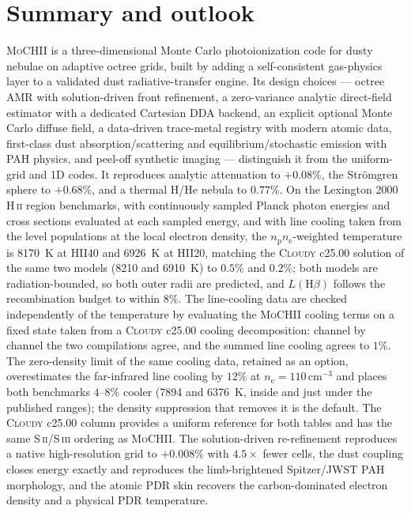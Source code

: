 \documentclass[twocolumn,linenumbers]{aastex702}
\newcommand{\MoCHII}{\textsc{MoCHII}}
\newcommand{\HII}{H\,\textsc{ii}}
\newcommand{\nelec}{n_{\mathrm{e}}}
\begin{document}
\section{Summary and outlook}
\label{sec:summary}

\MoCHII{} is a three-dimensional Monte Carlo photoionization code for dusty
nebulae on adaptive octree grids, built by adding a self-consistent
gas-physics layer to a validated dust radiative-transfer engine.  Its
design choices --- octree AMR with solution-driven front refinement, a
zero-variance analytic direct-field estimator with a dedicated Cartesian
DDA backend, an explicit optional Monte Carlo diffuse field, a
data-driven trace-metal registry with modern atomic data, first-class dust
absorption/scattering and equilibrium/stochastic emission with PAH physics,
and peel-off synthetic imaging --- distinguish it from the uniform-grid and
1D codes.  It reproduces analytic attenuation to $+0.08\%$, the Str\"omgren
sphere to $+0.68\%$, and a thermal H/He nebula to $0.77\%$.  On the
Lexington 2000 \HII{} region benchmarks, with continuously sampled Planck
photon energies and cross sections evaluated at each sampled energy, and
with line cooling taken from the level populations at the local electron
density, the
$n_{\mathrm{p}}n_{\mathrm{e}}$-weighted temperature is 8170~K at HII40 and
6926~K at HII20, matching the \textsc{Cloudy} c25.00 solution of the same
two models (8210 and 6910~K) to $0.5\%$ and $0.2\%$; both models are
radiation-bounded, so both outer radii are predicted, and
$L(\mathrm{H}\beta)$ follows the recombination budget to within $8\%$.  The
line-cooling data are checked independently of the temperature by evaluating
the \MoCHII{} cooling terms on a fixed state taken from a \textsc{Cloudy}
c25.00 cooling decomposition: channel by channel the two compilations agree,
and the summed line cooling agrees to $1\%$.  The zero-density limit of the
same cooling data, retained as an option, overestimates the far-infrared
line cooling by $12\%$ at $\nelec = 110\,\mathrm{cm^{-3}}$ and places both
benchmarks $4$--$8\%$ cooler (7894 and 6376~K, inside and just under the
published ranges); the density suppression that removes it is the default.
The \textsc{Cloudy} c25.00 column provides a uniform reference for both
tables and has the same S\,\textsc{ii}/S\,\textsc{iii} ordering as
\MoCHII{}.
The solution-driven
re-refinement reproduces a native high-resolution grid to $+0.008\%$ with
$4.5\times$ fewer cells, the dust coupling closes energy exactly and
reproduces the limb-brightened Spitzer/JWST PAH morphology, and the
atomic PDR skin
recovers the carbon-dominated electron density and a physical PDR
temperature.
\end{document}
